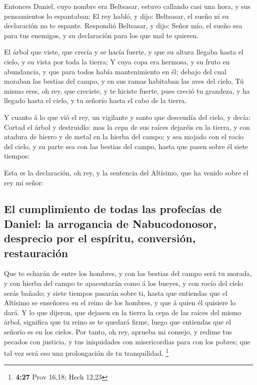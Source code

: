  Entonces Daniel, cuyo nombre era Beltsasar, estuvo
callando casi una hora, y sus pensamientos lo espantaban: El rey habló,
y dijo: Beltsasar, el sueño ni su declaración no te espante. Respondió
Beltsasar, y dijo: Señor mío, el sueño sea para tus enemigos, y su
declaración para los que mal te quieren.

 El árbol que viste, que crecía y se hacía fuerte, y que
su altura llegaba hasta el cielo, y su vista por toda la tierra;
 Y cuya copa era hermosa, y su fruto en abundancia, y que
para todos había mantenimiento en él; debajo del cual moraban las
bestias del campo, y en sus ramas habitaban las aves del cielo,
 Tú mismo eres, oh rey, que creciste, y te hiciste
fuerte, pues creció tu grandeza, y ha llegado hasta el cielo, y tu
señorío hasta el cabo de la tierra.

 Y cuanto á lo que vió el rey, un vigilante y santo que
descendía del cielo, y decía: Cortad el árbol y destruidlo: mas la cepa
de sus raíces dejaréis en la tierra, y con atadura de hierro y de metal
en la hierba del campo; y sea mojado con el rocío del cielo, y su parte
sea con las bestias del campo, hasta que pasen sobre él siete tiempos:

 Esta es la declaración, oh rey, y la sentencia del
Altísimo, que ha venido sobre el rey mi señor:

\hypertarget{el-cumplimiento-de-todas-las-profecuxedas-de-daniel-la-arrogancia-de-nabucodonosor-desprecio-por-el-espuxedritu-conversiuxf3n-restauraciuxf3n}{%
\subsection{El cumplimiento de todas las profecías de Daniel: la
arrogancia de Nabucodonosor, desprecio por el espíritu, conversión,
restauración}\label{el-cumplimiento-de-todas-las-profecuxedas-de-daniel-la-arrogancia-de-nabucodonosor-desprecio-por-el-espuxedritu-conversiuxf3n-restauraciuxf3n}}

 Que te echarán de entre los hombres, y con las bestias
del campo será tu morada, y con hierba del campo te apacentarán como á
los bueyes, y con rocío del cielo serás bañado; y siete tiempos pasarán
sobre ti, hasta que entiendas que el Altísimo se enseñorea en el reino
de los hombres, y que á quien él quisiere lo dará.  Y lo
que dijeron, que dejasen en la tierra la cepa de las raíces del mismo
árbol, significa que tu reino se te quedará firme, luego que entiendas
que el señorío es en los cielos.  Por tanto, oh rey,
aprueba mi consejo, y redime tus pecados con justicia, y tus iniquidades
con misericordias para con los pobres; que tal vez será eso una
prolongación de tu tranquilidad. \footnote{\textbf{4:27} Prov 16,18;
  Hech 12,23}

